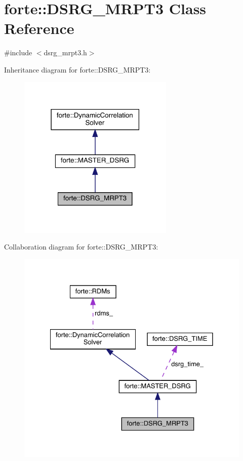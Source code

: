 \hypertarget{classforte_1_1_d_s_r_g___m_r_p_t3}{}\section{forte\+:\+:D\+S\+R\+G\+\_\+\+M\+R\+P\+T3 Class Reference}
\label{classforte_1_1_d_s_r_g___m_r_p_t3}


{\ttfamily \#include $<$dsrg\+\_\+mrpt3.\+h$>$}



Inheritance diagram for forte\+:\+:D\+S\+R\+G\+\_\+\+M\+R\+P\+T3\+:
\nopagebreak
\begin{figure}[H]
\begin{center}
\leavevmode
\includegraphics[width=210pt]{classforte_1_1_d_s_r_g___m_r_p_t3__inherit__graph}
\end{center}
\end{figure}


Collaboration diagram for forte\+:\+:D\+S\+R\+G\+\_\+\+M\+R\+P\+T3\+:
\nopagebreak
\begin{figure}[H]
\begin{center}
\leavevmode
\includegraphics[width=328pt]{classforte_1_1_d_s_r_g___m_r_p_t3__coll__graph}
\end{center}
\end{figure}
